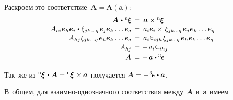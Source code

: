 \begin{otherlanguage}{russian}
Раскроем это соответствие~${\bm{A} \!=\! \bm{A}(\bm{a})}$:
\nopagebreak\[\begin{array}{r@{\hspace{1ex}}c@{\hspace{1ex}}l}
\bm{A} \hspace{0.2ex}\dotp\hspace{0.1ex} {^\mathrm{n}\hspace{-0.12ex}\bm{\xi}} & = & \bm{a} \hspace{0.2ex}\times {^\mathrm{n}\hspace{-0.12ex}\bm{\xi}} \\
%
A_{hi} \bm{e}_h \bm{e}_i \hspace{0.1ex}\dotp\hspace{0.25ex} \xi_{jk \ldots q} \hspace{0.2ex} \bm{e}_j \bm{e}_k \ldots \bm{e}_q & = & a_{i} \bm{e}_i \times\hspace{0.2ex} \xi_{jk \ldots q} \hspace{0.2ex} \bm{e}_j \bm{e}_k \ldots \bm{e}_q \\[0.1em]
%
A_{hj} \hspace{0.2ex} \xi_{jk \ldots q} \hspace{0.2ex} \bm{e}_h \bm{e}_k \ldots \bm{e}_q & = & a_{i} \levicivita_{ijh} \hspace{0.2ex} \xi_{jk \ldots q} \hspace{0.2ex} \bm{e}_h \bm{e}_k \ldots \bm{e}_q \\[0.1em]
%
A_{hj} & = & \! - \, a_{i} \levicivita_{ihj} \\[0.2em]
\bm{A} & = & \! - \, \bm{a} \dotp \levicivitatensor
\end{array}\]

Так~же из ${{^\mathrm{n}\hspace{-0.12ex}\bm{\xi}} \hspace{0.2ex}\dotp\hspace{0.1ex} \bm{A} = {^\mathrm{n}\hspace{-0.12ex}\bm{\xi}} \hspace{0.2ex}\times \bm{a}}$ получается ${\bm{A} = - \hspace{0.2ex} \levicivitatensor \dotp \bm{a}}$.

В~общем, для взаимно\hbox{-}однозначного соответствия между~${\hspace{-0.2ex}\bm{A}}$ и~$\bm{a}$ имеем


\end{otherlanguage}
